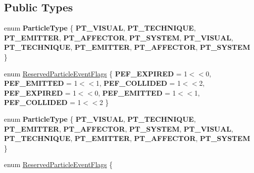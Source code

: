 \subsection*{Public Types}
\begin{DoxyCompactItemize}
\item 
\mbox{\label{structPUParticle3D_a45ed1542df608fc776dce382707e6206}} 
enum {\bfseries Particle\+Type} \{ \newline
{\bfseries P\+T\+\_\+\+V\+I\+S\+U\+AL}, 
{\bfseries P\+T\+\_\+\+T\+E\+C\+H\+N\+I\+Q\+UE}, 
{\bfseries P\+T\+\_\+\+E\+M\+I\+T\+T\+ER}, 
{\bfseries P\+T\+\_\+\+A\+F\+F\+E\+C\+T\+OR}, 
\newline
{\bfseries P\+T\+\_\+\+S\+Y\+S\+T\+EM}, 
{\bfseries P\+T\+\_\+\+V\+I\+S\+U\+AL}, 
{\bfseries P\+T\+\_\+\+T\+E\+C\+H\+N\+I\+Q\+UE}, 
{\bfseries P\+T\+\_\+\+E\+M\+I\+T\+T\+ER}, 
\newline
{\bfseries P\+T\+\_\+\+A\+F\+F\+E\+C\+T\+OR}, 
{\bfseries P\+T\+\_\+\+S\+Y\+S\+T\+EM}
 \}
\item 
enum \hyperlink{structPUParticle3D_a2889eb4db1dc86b0bd60c411c7f8c657}{Reserved\+Particle\+Event\+Flags} \{ \newline
{\bfseries P\+E\+F\+\_\+\+E\+X\+P\+I\+R\+ED} = 1$<$$<$0, 
{\bfseries P\+E\+F\+\_\+\+E\+M\+I\+T\+T\+ED} = 1$<$$<$1, 
{\bfseries P\+E\+F\+\_\+\+C\+O\+L\+L\+I\+D\+ED} = 1$<$$<$2, 
{\bfseries P\+E\+F\+\_\+\+E\+X\+P\+I\+R\+ED} = 1$<$$<$0, 
\newline
{\bfseries P\+E\+F\+\_\+\+E\+M\+I\+T\+T\+ED} = 1$<$$<$1, 
{\bfseries P\+E\+F\+\_\+\+C\+O\+L\+L\+I\+D\+ED} = 1$<$$<$2
 \}
\item 
\mbox{\label{structPUParticle3D_a45ed1542df608fc776dce382707e6206}} 
enum {\bfseries Particle\+Type} \{ \newline
{\bfseries P\+T\+\_\+\+V\+I\+S\+U\+AL}, 
{\bfseries P\+T\+\_\+\+T\+E\+C\+H\+N\+I\+Q\+UE}, 
{\bfseries P\+T\+\_\+\+E\+M\+I\+T\+T\+ER}, 
{\bfseries P\+T\+\_\+\+A\+F\+F\+E\+C\+T\+OR}, 
\newline
{\bfseries P\+T\+\_\+\+S\+Y\+S\+T\+EM}, 
{\bfseries P\+T\+\_\+\+V\+I\+S\+U\+AL}, 
{\bfseries P\+T\+\_\+\+T\+E\+C\+H\+N\+I\+Q\+UE}, 
{\bfseries P\+T\+\_\+\+E\+M\+I\+T\+T\+ER}, 
\newline
{\bfseries P\+T\+\_\+\+A\+F\+F\+E\+C\+T\+OR}, 
{\bfseries P\+T\+\_\+\+S\+Y\+S\+T\+EM}
 \}
\item 
enum \hyperlink{structPUParticle3D_a2889eb4db1dc86b0bd60c411c7f8c657}{Reserved\+Particle\+Event\+Flags} \{ \newline

\end{DoxyCompactItemize}
